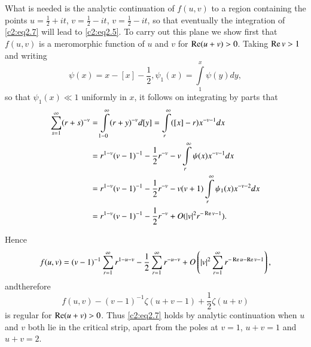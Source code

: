 What is needed is the analytic continuation of $f(u, v)$ to a region
containing the points $u= \frac{1}{2} + it$, $v= \frac{1}{2} -it$, $v=
\frac{1}{2} - it$, so that eventually the integration of
\eqref{c2:eq2.7} will lead to \eqref{c2:eq2.5}. To carry out this
plane we show first that $f(u, v)$ is a meromorphic function of $u$
and $v$ for $\operatorname{Re} (u + v)> 0$. Taking $\operatorname{Re} v > 1$ and writing 
$$
\psi (x) = x- [x]- \frac{1}{2}, \psi_1 (x) = \int\limits_1^x \psi (y) dy,
$$ 
so that $\psi_1 (x) \ll 1$ uniformly in $x$, it follows on integrating
by parts that
\begin{align*}
  \sum^\infty_{s=1} (r+s)^{-v}& = \int\limits^\infty_{1-0} (r+y)^{-v}
  d[y]= \int\limits_r^\infty ([x] - r)x^{-v-1}dx\\
  & = r^{1-v} (v-1)^{-1} - \frac{1}{2} r^{-v} - v \int\limits_r^\infty
  \psi (x) x^{-v -1} dx\\
  & = r^{1 -v} (v-1)^{-1} - \frac{1}{2} r^{-v} - v(v+1)
  \int\limits^\infty_r \psi_1 (x) x^{-v -2} dx\\
  & = r^{1-v} (v-1)^{-1} - \frac{1}{2} r^{-v} + O (|v|^2 r^{- \operatorname{Re} v-1}).
\end{align*}

Hence
$$
f(u, v) = (v-1)^{-1} \sum^\infty_{r=1} r^{1- u -v} - \frac{1}{2}
\sum^\infty_{r=1} r^{- u-v} + O \left(|v|^2\sum^\infty_{r=1} r^{- \operatorname{Re} u-
  \operatorname{Re} v-1}\right),
$$
and\pageoriginale therefore 
$$
f(u, v)- (v-1)^{-1} \zeta (u+v-1)+ \frac{1}{2} \zeta (u+v)
$$
is regular for $\operatorname{Re} (u+v)> 0$. Thus \eqref{c2:eq2.7} holds by analytic
continuation when $u$ and $v$ both lie in the critical strip, apart
from the poles at $v=1$, $u+v=1$ and $u+v=2$.

